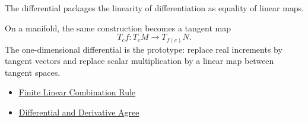 \begin{remark*}[Interpretation]
The differential packages the linearity of differentiation as equality of linear maps.


On a manifold, the same construction becomes a tangent map
\[
  T_cf:T_cM\to T_{f(c)}N.
\]
The one-dimensional differential is the prototype: replace real increments by tangent vectors and replace scalar multiplication by a linear map between tangent spaces.
\end{remark*}

\begin{dependencies}
\begin{itemize}
  \item \hyperref[thm:finite-linear-combination-rule]{Finite Linear Combination Rule}
  \item \hyperref[thm:differential-and-derivative-agree]{Differential and Derivative Agree}
\end{itemize}
\end{dependencies}

